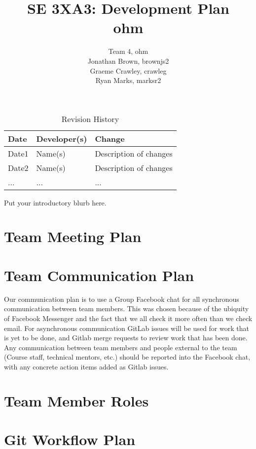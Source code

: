 \documentclass{article}
\title{SE 3XA3: Development Plan \\ohm}
\author{Team 4, ohm
		\\Jonathan Brown, brownjs2
		\\Graeme Crawley, crawleg
		\\Ryan Marks, marksr2
}
\date{}
\begin{document}
\begin{table}[hp]
\caption{Revision History} \label{TblRevisionHistory}
\begin{tabularx}{\textwidth}{llX}
\toprule
\textbf{Date} & \textbf{Developer(s)} & \textbf{Change}\\
\midrule
Date1 & Name(s) & Description of changes\\
Date2 & Name(s) & Description of changes\\
... & ... & ...\\
\bottomrule
\end{tabularx}
\end{table}

\newpage

\maketitle

Put your introductory blurb here.

\section{Team Meeting Plan}

\section{Team Communication Plan}

Our communication plan is to use a Group Facebook chat for all synchronous communication between team members.
This was chosen because of the ubiquity of Facebook Messenger and the fact that we all check it more often than we check email.
For asynchronous communication GitLab issues will be used for work that is yet to be done, and Gitlab merge requests to review work that has been done.
Any communication between team members and people external to the team (Course staff, technical mentors, etc.) should be reported into the Facebook chat, 
with any concrete action items added as Gitlab issues.

\section{Team Member Roles}



\section{Git Workflow Plan}
\end{document}
